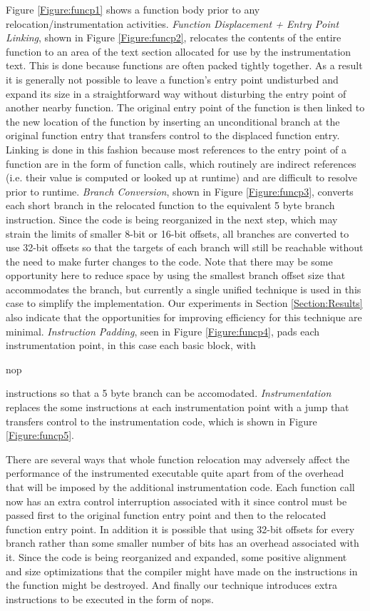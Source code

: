 Figure \ref{Figure:funcp1} shows a function body prior to any relocation/instrumentation activities.
\textit{Function Displacement + Entry Point Linking}, shown in Figure \ref{Figure:funcp2},
relocates the contents of the entire function to an area of the text section allocated
for use by the instrumentation text. 
This is done because functions are often packed tightly together. 
As a result it is generally not possible to leave a function's entry point undisturbed and
expand its size in a straightforward way without disturbing the entry point 
of another nearby function. The original entry point of the function is then linked to the new location
of the function by inserting an unconditional branch at the original 
function entry that transfers control to the displaced function entry. 
Linking is done in this fashion because most references to the entry point of a function are in the form of function calls, which
routinely are indirect references (i.e. their value is computed or looked up at runtime) and are difficult to resolve
prior to runtime. \textit{Branch Conversion}, shown in Figure \ref{Figure:funcp3}, 
converts each short branch in the relocated function to the equivalent
5 byte branch instruction. Since the code is being reorganized in the next step, which may strain the limits of
smaller 8-bit or 16-bit offsets, all branches are converted to use 32-bit offsets so that the targets of each branch
will still be reachable without the need to make furter changes to the code. Note that there may be some opportunity
here to reduce space by using the smallest branch offset size that accommodates the branch, but currently a single 
unified technique is used in this case to simplify the implementation. Our experiments in Section \ref{Section:Results}
also indicate that the opportunities for improving efficiency for this technique are minimal. \textit{Instruction Padding}, seen
in Figure \ref{Figure:funcp4}, pads
each instrumentation point, in this case each basic block, with \begin{it}nop\end{it} instructions so that a 5 byte branch can be accomodated. \textit{Instrumentation} replaces the
some instructions at each instrumentation point with a jump that transfers control to the instrumentation code, which is shown in Figure
\ref{Figure:funcp5}.

There are several ways that whole function relocation may adversely affect 
the performance of the instrumented executable quite apart from of the overhead
that will be imposed by the additional instrumentation code. Each function call
now has an extra control interruption associated with it since control must be passed first to the original function entry
point and then to the relocated function entry point. In addition it is possible that using 32-bit offsets for every branch rather than
some smaller number of bits has an overhead associated with it. Since the code is being reorganized and expanded, 
some positive alignment and size optimizations that the compiler might have made on the instructions in the
function might be destroyed. And finally our technique introduces extra instructions to be executed in the form of nops.

